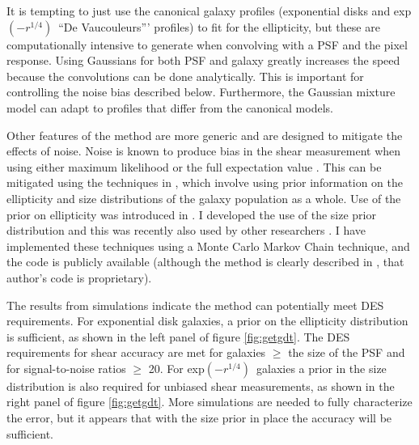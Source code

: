 \documentclass[12pt]{article}
\newcommand{\devauc}{De Vaucouleurs'}
\newcommand{\devprof}{exp$(-r^{1/4})$}
\begin{document}
It is tempting to just use the canonical galaxy profiles (exponential disks and
\devprof\ ``\devauc'' profiles) to fit for the ellipticity, but these are
computationally intensive to generate when convolving with a PSF and the pixel
response.  Using Gaussians for both PSF and galaxy greatly increases the speed
because the convolutions can be done analytically.  This is important for
controlling the noise bias described below.  Furthermore, the Gaussian mixture
model can adapt to profiles that differ from the canonical models.

Other features of the method are more generic and are designed to mitigate the
effects of noise.  Noise is known to produce bias in the shear measurement when
using either maximum likelihood \cite{Refreg12} or the full expectation value
\cite{Miller12}.  This can be mitigated using the techniques in
\cite{Miller07,Miller12}, which involve using prior information on the
ellipticity and size distributions of the galaxy population as a whole.  Use of
the prior on ellipticity was introduced in \cite{Miller07}. I developed the use
of the size prior distribution and this was recently also used by other
researchers \cite{Miller12}.  I have implemented these techniques using a Monte
Carlo Markov Chain technique, and the code is publicly available (although the
method is clearly described in \cite{Miller07}, that author's code is
proprietary).

The results from simulations indicate the method can potentially meet DES
requirements.  For exponential disk galaxies, a prior on the ellipticity
distribution is sufficient, as shown in the left panel of figure
\ref{fig:getgdt}.  The DES requirements for shear accuracy are met for galaxies
$\geq$ the size of the PSF and for signal-to-noise ratios $\geq$ 20.  For
\devprof\ galaxies a prior in the size distribution is also required for
unbiased shear measurements, as shown in the right panel of figure
\ref{fig:getgdt}.  More simulations are needed to fully characterize the error,
but it appears that with the size prior in place the accuracy will be
sufficient.
\end{document}
